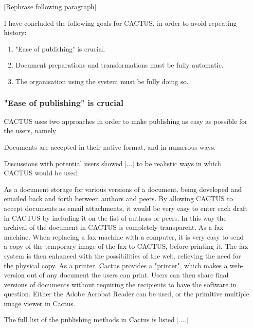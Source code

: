 [Rephrase following paragraph]

I have concluded the following goals for CACTUS, in order to
avoid repeating history:

\begin{enumerate}
\item "Ease of publishing" is crucial.
  
\item Document preparations and transformations must be
  fully automatic.
  
\item The organisation using the system must be fully doing
  so.

\end{enumerate}

\subsubsection{"Ease of publishing" is crucial}

CACTUS uses two approaches in order to make publishing as
easy as possible for the users, namely

\begin{center}
  Documents are accepted in their native format, and in
  numerous ways.
\end{center}

Discussions with potential users showed [...] to be
realistic ways in which CACTUS would be used:

As a document storage for various versions of a document,
being developed and emailed back and forth between authors
and peers.  By allowing CACTUS to accept documents as email
attachments, it would be very easy to enter each draft in
CACTUS by including it on the list of authors or peers.  In
this way the archival of the document in CACTUS is
completely transparent.  As a fax machine.  When replacing a
fax machine with a computer, it is very easy to send a copy
of the temporary image of the fax to CACTUS, before printing
it.  The fax system is then enhanced with the possibilities
of the web, relieving the need for the physical copy.  As a
printer.  Cactus provides a "printer", which makes a
web-version out of any document the users can print.  Users
can then share final versions of documents without requiring
the recipients to have the software in question.  Either the
Adobe Acrobat Reader can be used, or the primitive multiple
image viewer in Cactus.

The full list of the publishing methods in Cactus is listed
[....]

